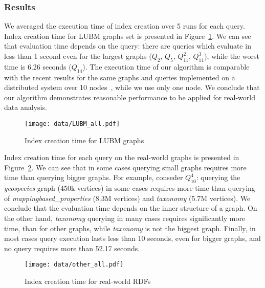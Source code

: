 \subsubsection{Results}

We averaged the execution time of index creation over 5 runs for each query.
Index creation time for LUBM graphs set is presented in Figure~\ref{fig:lubm_all_qs}.
We can see that evaluation time depends on the query: there are queries which evaluate in less than 1 second even for the largest graphs ($Q_2$, $Q_5$, $Q_{11}^2$, $Q_{11}^3$), while the worst time is 6.26 seconds ($Q_{14}$).
The execution time of our algorithm is comparable with the recent results for the same graphs and queries implemented on a distributed system over 10 nodes~\citep{Wang2019}, while we use only one node.
We conclude that our algorithm demonstrates reasonable performance to be applied for real-world data analysis.

\begin{figure}
    \centering
   \texttt{[image: data/LUBM\_all.pdf]}
   \caption{Index creation time for LUBM graphs}
   \label{fig:lubm_all_qs}
\end{figure}

Index creation time for each query on the real-world graphs is presented in Figure~\ref{fig:other_all_qs}.
We can see that in some cases querying small graphs requires more time than querying bigger graphs.
For example, conseder $Q_{10}^4$: querying the \textit{geospecies} graph (450k vertices) in some cases requires more time than querying of \textit{mappingbased\_properties} (8.3M vertices) and \textit{taxonomy} (5.7M vertices).
We conclude that the evaluation time depends on the inner structure of a graph.
On the other hand, \textit{taxonomy} querying in many cases requires significantly more time, than for other graphs, while \textit{taxonomy} is not the biggest graph.
Finally, in most cases query execution lasts less than 10 seconds, even for bigger graphs, and no query requires more than 52.17 seconds.

\begin{figure}
    \centering
   \texttt{[image: data/other\_all.pdf]}
   \caption{Index creation time for real-world RDFs}
   \label{fig:other_all_qs}
\end{figure}


